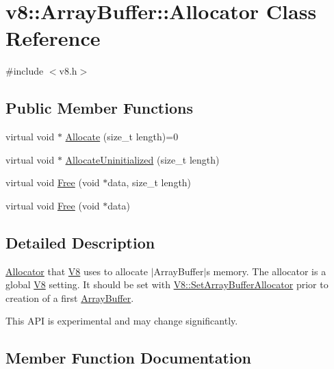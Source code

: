 \hypertarget{classv8_1_1_array_buffer_1_1_allocator}{}\section{v8\+:\+:Array\+Buffer\+:\+:Allocator Class Reference}
\label{classv8_1_1_array_buffer_1_1_allocator}


{\ttfamily \#include $<$v8.\+h$>$}

\subsection*{Public Member Functions}
\begin{DoxyCompactItemize}
\item 
virtual void $\ast$ \hyperlink{classv8_1_1_array_buffer_1_1_allocator_a106b0d80120ed04fe9b9675e96f0340b}{Allocate} (size\+\_\+t length)=0
\item 
virtual void $\ast$ \hyperlink{classv8_1_1_array_buffer_1_1_allocator_a98430f14830f91d970fca39ddfda86fe}{Allocate\+Uninitialized} (size\+\_\+t length)
\item 
virtual void \hyperlink{classv8_1_1_array_buffer_1_1_allocator_a0f13d3b274ac08605f7fd5c7d24c0891}{Free} (void $\ast$data, size\+\_\+t length)
\item 
virtual void \hyperlink{classv8_1_1_array_buffer_1_1_allocator_a7161240e93afb215030dadc70976c1e5}{Free} (void $\ast$data)
\end{DoxyCompactItemize}


\subsection{Detailed Description}
\hyperlink{classv8_1_1_array_buffer_1_1_allocator}{Allocator} that \hyperlink{classv8_1_1_v8}{V8} uses to allocate $\vert$\+Array\+Buffer$\vert$\textquotesingle{}s memory. The allocator is a global \hyperlink{classv8_1_1_v8}{V8} setting. It should be set with \hyperlink{classv8_1_1_v8_abc40950a39f8cb6946dc8a1ad41eea84}{V8\+::\+Set\+Array\+Buffer\+Allocator} prior to creation of a first \hyperlink{classv8_1_1_array_buffer}{Array\+Buffer}.

This A\+P\+I is experimental and may change significantly. 

\subsection{Member Function Documentation}
\hypertarget{classv8_1_1_array_buffer_1_1_allocator_a106b0d80120ed04fe9b9675e96f0340b}{}
